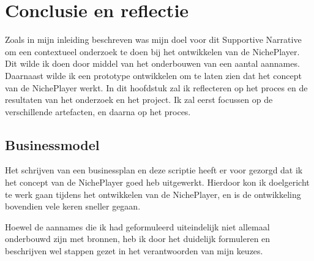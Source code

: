 \section{Conclusie en reflectie}

Zoals in mijn inleiding beschreven was mijn doel voor dit Supportive Narrative om een contextueel onderzoek te doen bij het ontwikkelen van de NichePlayer. Dit wilde ik doen door middel van het onderbouwen van een aantal aannames. Daarnaast wilde ik een prototype ontwikkelen om te laten zien dat het concept van de NichePlayer werkt. In dit hoofdstuk zal ik reflecteren op het proces en de resultaten van het onderzoek en het project. Ik zal eerst focussen op de verschillende artefacten, en daarna op het proces.

\subsection{Businessmodel}
Het schrijven van een businessplan en deze scriptie heeft er voor gezorgd dat ik het concept van de NichePlayer goed heb uitgewerkt. Hierdoor kon ik doelgericht te werk gaan tijdens het ontwikkelen van de NichePlayer, en is de ontwikkeling bovendien vele keren sneller gegaan.

Hoewel de aannames die ik had geformuleerd uiteindelijk niet allemaal onderbouwd zijn met bronnen, heb ik door het duidelijk formuleren en beschrijven wel stappen gezet in het verantwoorden van mijn keuzes.

